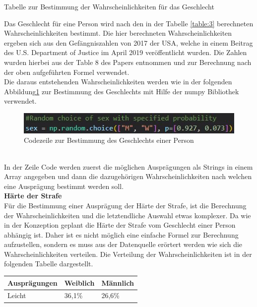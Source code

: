 \begin{onehalfspace}
\begin{table}[h]
\caption{Tabelle zur Bestimmung der Wahrscheinlichkeiten für das Geschlecht}
\label{table:3}
\end{table}
Das Geschlecht für eine Person wird nach den in der Tabelle \ref{table:3} berechneten Wahrscheinlichkeiten bestimmt. Die hier berechneten Wahrscheinlichkeiten ergeben sich aus den Gefängniszahlen von 2017 der USA, welche in einem Beitrag des U.S. Department of Justice im April 2019 veröffentlicht wurden. Die Zahlen wurden hierbei aus der \glqq{}Table 8\grqq{} des Papers entnommen und zur Berechnung nach der oben aufgeführten Formel verwendet.\cite[S. 17]{Prisoners}\\
Die daraus entstehenden Wahrscheinlichkeiten werden wie in der folgenden Abbildung\ref{fig:GeschlechtscodeS1} zur Bestimmung des Geschlechts mit Hilfe der \glqq{}numpy\grqq{} Bibliothek verwendet.
\begin{figure}[h]
    \centering
    \includegraphics{Diagramme/Sz1_GeschlechtsCode.JPG}
    \caption{Codezeile zur Bestimmung des Geschlechts einer Person}
    \label{fig:GeschlechtscodeS1}
\end{figure}\\
In der Zeile Code werden zuerst die möglichen Ausprägungen als Strings in einem Array angegeben und dann die dazugehörigen Wahrscheinlichkeiten nach welchen eine Ausprägung bestimmt werden soll.\\
\textbf{Härte der Strafe}\\
Für die Bestimmung einer Ausprägung der Härte der Strafe, ist die Berechnung der Wahrscheinlichkeiten und die letztendliche Auswahl etwas komplexer. Da wie in der Konzeption geplant die Härte der Strafe vom Geschlecht einer Person abhängig ist. Daher ist es nicht möglich eine einfache Formel zur Berechnung aufzustellen, sondern es muss aus der Datenquelle erörtert werden wie sich die Wahrscheinlichkeiten verteilen. Die Verteilung der Wahrscheinlichkeiten ist in der folgenden Tabelle dargestellt.\\
\begin{table}[h]
    \centering
    \begin{tabular}{|l|l|l|}
    \hline
    \textbf{Ausprägungen} & \textbf{Weiblich} & \textbf{Männlich} \\ \hline
    Leicht                & 36,1\%            & 26,6\%            \\ \hline

\end{tabular}
\end{table}
\end{onehalfspace}
